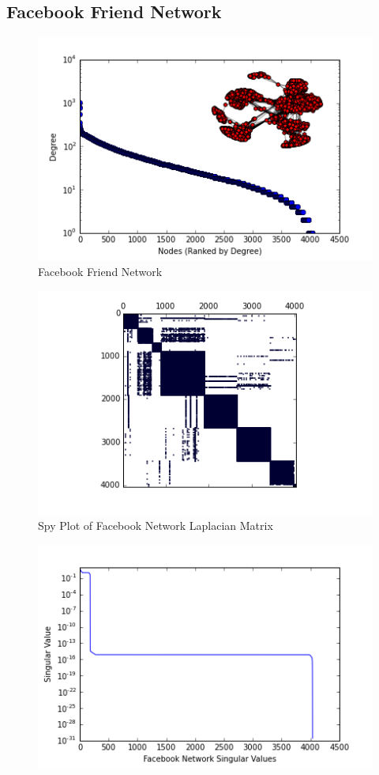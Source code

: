 \documentclass{article}
\begin{document}
\subsection{Facebook Friend Network}
\begin{figure}[H]
\centering

\includegraphics[width=.8\linewidth]{fb_degree_histogram.png}
\caption{Facebook Friend Network}
  
\end{figure}

\begin{figure}[H]
\centering
\includegraphics[width = \linewidth]{fbspy.png}
\caption{Spy Plot of Facebook Network Laplacian Matrix}
\end{figure}
\begin{figure}[H]
\centering
\includegraphics[width = .9\linewidth]{fbsing.png}
\end{figure}
\end{document}
